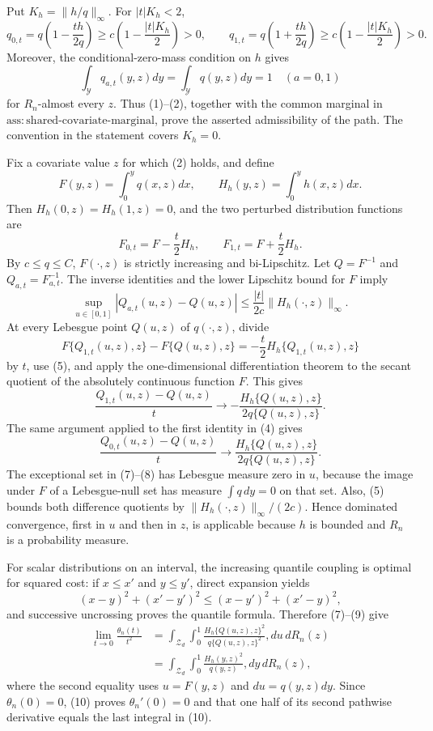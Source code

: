 Put \(K_h=\|h/q\|_\infty\). For \(|t|K_h<2\),
\[
q_{0,t}=q\left(1-\frac{t h}{2q}\right)
\ge c\left(1-\frac{|t|K_h}{2}\right)>0,
\qquad
q_{1,t}=q\left(1+\frac{t h}{2q}\right)
\ge c\left(1-\frac{|t|K_h}{2}\right)>0.
\tag{1}
\]
Moreover, the conditional-zero-mass condition on \(h\) gives
\[
\int_{\mathcal Y}q_{a,t}(y,z)dy=\int_{\mathcal Y}q(y,z)dy=1
\quad(a=0,1)
\tag{2}
\]
for \(R_n\)-almost every \(z\). Thus (1)--(2), together with the common marginal in \(\mathrm{ass{:}shared\text{-}covariate\text{-}marginal}\), prove the asserted admissibility of the path. The convention in the statement covers \(K_h=0\).

Fix a covariate value \(z\) for which (2) holds, and define
\[
F(y,z)=\int_0^yq(x,z)dx,
\qquad
H_h(y,z)=\int_0^yh(x,z)dx.
\tag{3}
\]
Then \(H_h(0,z)=H_h(1,z)=0\), and the two perturbed distribution functions are
\[
F_{0,t}=F-\frac{t}{2}H_h,
\qquad
F_{1,t}=F+\frac{t}{2}H_h.
\tag{4}
\]
By \(c\le q\le C\), \(F(\cdot,z)\) is strictly increasing and bi-Lipschitz. Let \(Q=F^{-1}\) and \(Q_{a,t}=F_{a,t}^{-1}\). The inverse identities and the lower Lipschitz bound for \(F\) imply
\[
\sup_{u\in[0,1]}|Q_{a,t}(u,z)-Q(u,z)|
\le \frac{|t|}{2c}\|H_h(\cdot,z)\|_\infty.
\tag{5}
\]
At every Lebesgue point \(Q(u,z)\) of \(q(\cdot,z)\), divide
\[
F\{Q_{1,t}(u,z),z\}-F\{Q(u,z),z\}
=-\frac{t}{2}H_h\{Q_{1,t}(u,z),z\}
\tag{6}
\]
by \(t\), use (5), and apply the one-dimensional differentiation theorem to the secant quotient of the absolutely continuous function \(F\). This gives
\[
\frac{Q_{1,t}(u,z)-Q(u,z)}{t}
\longrightarrow-\frac{H_h\{Q(u,z),z\}}{2q\{Q(u,z),z\}}.
\tag{7}
\]
The same argument applied to the first identity in (4) gives
\[
\frac{Q_{0,t}(u,z)-Q(u,z)}{t}
\longrightarrow\frac{H_h\{Q(u,z),z\}}{2q\{Q(u,z),z\}}.
\tag{8}
\]
The exceptional set in (7)--(8) has Lebesgue measure zero in \(u\), because the image under \(F\) of a Lebesgue-null set has measure \(\int q\,dy=0\) on that set. Also, (5) bounds both difference quotients by \(\|H_h(\cdot,z)\|_\infty/(2c)\). Hence dominated convergence, first in \(u\) and then in \(z\), is applicable because \(h\) is bounded and \(R_n\) is a probability measure.

For scalar distributions on an interval, the increasing quantile coupling is optimal for squared cost: if \(x\le x'\) and \(y\le y'\), direct expansion yields
\[
(x-y)^2+(x'-y')^2\le(x-y')^2+(x'-y)^2,
\tag{9}
\]
and successive uncrossing proves the quantile formula. Therefore (7)--(9) give
\[
\begin{split}
\lim_{t\to0}\frac{\theta_n(t)}{t^2}
&=\int_{\mathcal Z_d}\int_0^1
\frac{H_h\{Q(u,z),z\}^2}{q\{Q(u,z),z\}^2},du\,dR_n(z)\\
&=\int_{\mathcal Z_d}\int_0^1\frac{H_h(y,z)^2}{q(y,z)},dy\,dR_n(z),
\end{split}
\tag{10}
\]
where the second equality uses \(u=F(y,z)\) and \(du=q(y,z)dy\). Since \(\theta_n(0)=0\), (10) proves \(\theta_n'(0)=0\) and that one half of its second pathwise derivative equals the last integral in (10).

